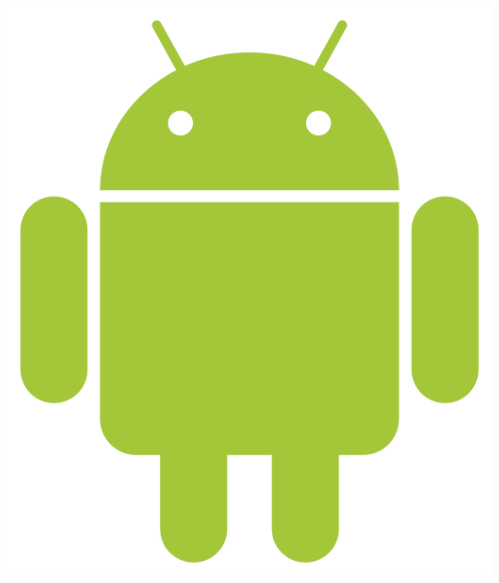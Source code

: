\documentclass[aspectratio=1610, twocolumn]{beamer}%
\begin{document}
\framegreen
{
  \nologo
  \begin{frameTitle}
  \maketitle
  \end{frameTitle}
}

\begin{frameNoSB} 
\frametitle{\inserttitle}
\begin{columns}
  \begin{column}{.66\linewidth}
    \vspace{0pt}
    \tableofcontents
  \end{column}
  \begin{column}{0.33\linewidth}
  \includegraphics[width=0.75\linewidth]{img/android.png}
  \end{column}
\end{columns}
\end{frameNoSB}

\framepurple


\framebrown


\framebluegray


\frameyellow


\framegray


\frameorange

\end{document}
